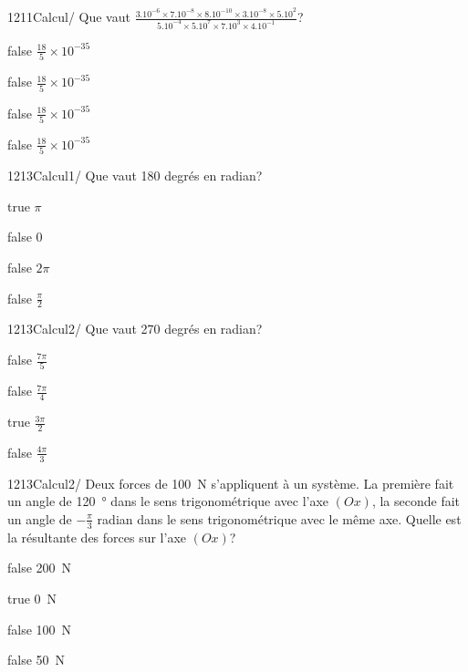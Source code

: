             \begin{question}{1211}{Calcul}{}{/}
                Que vaut $\frac{3.10^{-6}\times 7.10^{-8}\times 8.10^{-10}\times 3.10^{-8}\times 5.10^{2}}{5.10^{-4}\times 5.10^{7}\times 7.10^{3}\times 4.10^{-1}}$?
            \end{question}
            \begin{reponses}
                \item[false] $\frac{18}{5}\times 10^{-35}$
                \item[false] $\frac{18}{5}\times 10^{-35}$
                \item[false] $\frac{18}{5}\times 10^{-35}$
                \item[false] $\frac{18}{5}\times 10^{-35}$
            \end{reponses}
        	\begin{question}{1213}{Calcul}{1}{/}
				Que vaut 180 degrés en radian?
            \end{question}
            \begin{reponses}
            	\item[true] $\pi$
            	\item[false] 0
                \item[false] $2\pi$
                \item[false] $\frac{\pi}{2}$
            \end{reponses}
            \begin{question}{1213}{Calcul}{2}{/}
                Que vaut 270 degrés en radian?
            \end{question}
            \begin{reponses}
                \item[false] $\frac{7\pi}{5}$
                \item[false] $\frac{7\pi}{4}$
                \item[true] $\frac{3\pi}{2}$
                \item[false] $\frac{4\pi}{3}$
            \end{reponses}
            \begin{question}{1213}{Calcul}{2}{/}
                Deux forces de \SI{100}{\newton} s'appliquent à un système. La première fait un angle de \SI{+120}{\degree} dans le sens trigonométrique avec l'axe $(Ox)$, la seconde fait un angle de $-\frac{\pi}{3}$ radian dans le sens trigonométrique avec le même axe. Quelle est la résultante des forces sur l'axe $(Ox)$?
            \end{question}
            \begin{reponses}
                \item[false] \SI{200}{\newton}
                \item[true] \SI{0}{\newton}
                \item[false] \SI{100}{\newton}
                \item[false] \SI{50}{\newton}
            \end{reponses}
